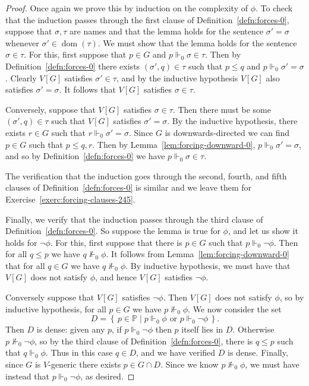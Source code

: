 \documentclass[11pt,oneside]{amsbook}
\newcommand{\set}[1]{\left\{\,#1\,\right\}}
\newcommand{\PP}{\mathbb P}
\newcommand{\forces}{\Vdash}
\DeclareMathOperator{\dom}{dom}
\theoremstyle{definition}
\theoremstyle{plain}
\theoremstyle{definition}
\theoremstyle{remark}
\numberwithin{equation}{section}
\numberwithin{figure}{section}
\begin{document}
\begin{proof}
  Once again we prove this by induction on the complexity of $\phi$. To check that the induction passes through the first clause of Definition~\ref{defn:forces-0}, suppose that $\sigma,\tau$ are names and that the lemma holds for the sentence $\sigma'=\sigma$ whenever $\sigma'\in\dom(\tau)$. We must show that the lemma holds for the sentence $\sigma\in\tau$. For this, first suppose that $p\in G$ and $p\forces_0\sigma\in\tau$. Then by Definition~\ref{defn:forces-0} there exists $(\sigma',q)\in\tau$ such that $p\leq q$ and $p\forces_0\sigma'=\sigma$. Clearly $V[G]$ satisfies $\sigma'\in\tau$, and by the inductive hypothesis $V[G]$ also satisfies $\sigma'=\sigma$. It follows that $V[G]$ satisfies $\sigma\in\tau$.

  Conversely, suppose that $V[G]$ satisfies $\sigma\in\tau$. Then there must be some $(\sigma',q)\in\tau$ such that $V[G]$ satisfies $\sigma'=\sigma$. By the inductive hypothesis, there exists $r\in G$ such that $r\forces_0\sigma'=\sigma$. Since $G$ is downwards-directed we can find $p\in G$ such that $p\leq q,r$. Then by Lemma~\ref{lem:forcing-downward-0}, $p\forces_0\sigma'=\sigma$, and so by Definition~\ref{defn:forces-0} we have $p\forces_0\sigma\in\tau$.

  The verification that the induction goes through the second, fourth, and fifth clauses of Definition~\ref{defn:forces-0} is similar and we leave them for Exercise~\ref{exerc:forcing-clauses-245}.

  Finally, we verify that the induction passes through the third clause of Definition~\ref{defn:forces-0}. So suppose the lemma is true for $\phi$, and let us show it holds for $\neg\phi$. For this, first suppose that there is $p\in G$ such that $p\forces_0\neg\phi$. Then for all $q\leq p$ we have $q\not\forces_0\phi$. It follows from Lemma~\ref{lem:forcing-downward-0} that for all $q\in G$ we have $q\not\forces_0\phi$. By inductive hypothesis, we must have that $V[G]$ does not satisfy $\phi$, and hence $V[G]$ satisfies $\neg\phi$.

  Conversely suppose that $V[G]$ satisfies $\neg\phi$. Then $V[G]$ does not satisfy $\phi$, so by inductive hypothesis, for all $p\in G$ we have $p\not\forces_0\phi$. We now consider the set
\[D=\set{p\in\PP\mid p\forces_0\phi\text{ or }p\forces_0\neg\phi}\text{.}
\]
Then $D$ is dense: given any $p$, if $p\forces_0\neg\phi$ then $p$ itself lies in $D$. Otherwise $p\not\forces_0\neg\phi$, so by the third clause of Definition~\ref{defn:forces-0}, there is $q\leq p$ such that $q\forces_0\phi$. Thus in this case $q\in D$, and we have verified $D$ is dense. Finally, since $G$ is $V$-generic there exists $p\in G\cap D$. Since we know $p\not\forces_0\phi$, we must have instead that $p\forces_0\neg\phi$, as desired.
\end{proof}
\end{document}
